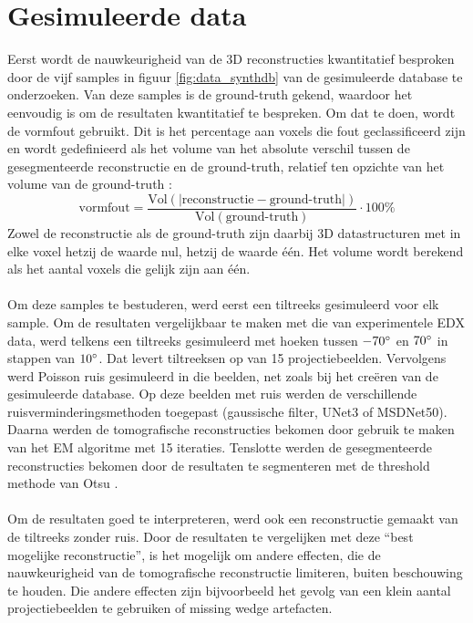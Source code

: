 \documentclass{report}
\begin{document}
\section{Gesimuleerde data} \label{ch:tomo_sim}
Eerst wordt de nauwkeurigheid van de 3D reconstructies kwantitatief besproken door de vijf samples in figuur \ref{fig:data_synthdb} van de gesimuleerde database te onderzoeken. Van deze samples is de ground-truth gekend, waardoor het eenvoudig is om de resultaten kwantitatief te bespreken. Om dat te doen, wordt de vormfout gebruikt. Dit is het percentage aan voxels die fout geclassificeerd zijn en wordt gedefinieerd als het volume van het absolute verschil tussen de gesegmenteerde reconstructie en de ground-truth, relatief ten opzichte van het volume van de ground-truth \cite{paper:shapeerror}:
\[ \text{vormfout} = \frac{\text{Vol}(|\text{reconstructie}-\text{ground-truth}|)}{\text{Vol}(\text{ground-truth})} \cdot 100\% \]
Zowel de reconstructie als de ground-truth zijn daarbij 3D datastructuren met in elke voxel hetzij de waarde nul, hetzij de waarde één. Het volume wordt berekend als het aantal voxels die gelijk zijn aan één.
\\ \\
Om deze samples te bestuderen, werd eerst een tiltreeks gesimuleerd voor elk sample. Om de resultaten vergelijkbaar te maken met die van experimentele EDX data, werd telkens een tiltreeks gesimuleerd met hoeken tussen $-70\degree$ en $70\degree$ in stappen van $10\degree$. Dat levert tiltreeksen op van 15 projectiebeelden. Vervolgens werd Poisson ruis gesimuleerd in die beelden, net zoals bij het creëren van de gesimuleerde database. Op deze beelden met ruis werden de verschillende ruisverminderingsmethoden toegepast (gaussische filter, UNet3 of MSDNet50). Daarna werden de tomografische reconstructies bekomen door gebruik te maken van het EM algoritme met 15 iteraties. Tenslotte werden de gesegmenteerde reconstructies bekomen door de resultaten te segmenteren met de threshold methode van Otsu \cite{paper:otsu}.
\\ \\
Om de resultaten goed te interpreteren, werd ook een reconstructie gemaakt van de tiltreeks zonder ruis. Door de resultaten te vergelijken met deze ``best mogelijke reconstructie'', is het mogelijk om andere effecten, die de nauwkeurigheid van de tomografische reconstructie limiteren, buiten beschouwing te houden. Die andere effecten zijn bijvoorbeeld het gevolg van een klein aantal projectiebeelden te gebruiken of missing wedge artefacten.
\\ \\
\end{document}
